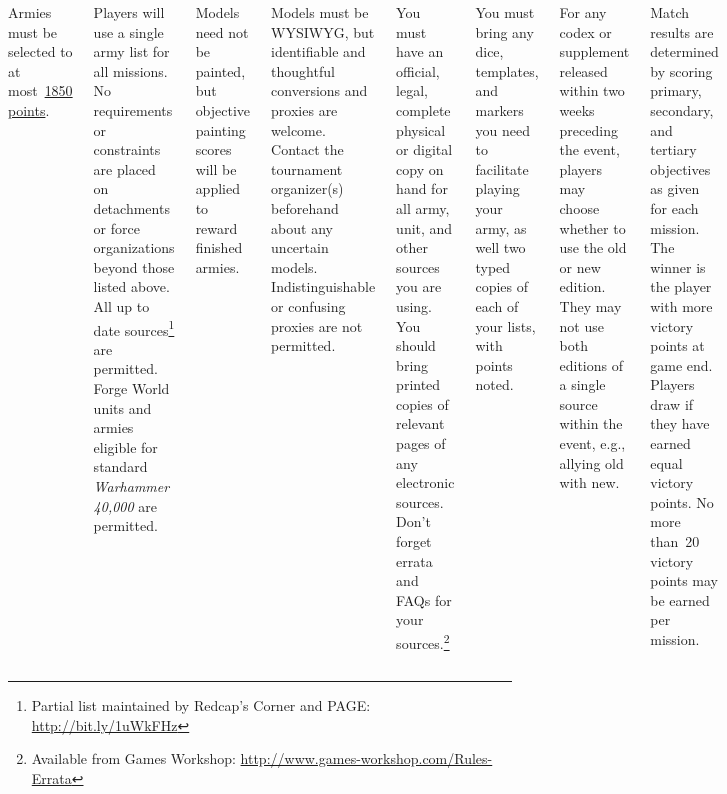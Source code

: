 \documentclass{40k}
\begin{document}

\begin{columns}


Armies must be selected to at most~\underline{1850 points}.


Players will use a single army list for all missions.  No requirements
or constraints are placed on detachments or force organizations beyond
those listed above.  All up to date sources\footnote{Partial list
  maintained by Redcap's Corner and PAGE: \url{http://bit.ly/1uWkFHz}}
are permitted.  Forge World units and armies eligible for standard
\emph{Warhammer 40,000} are permitted.

Models need not be painted, but objective painting scores will be
applied to reward finished armies.

Models must be WYSIWYG, but identifiable and thoughtful conversions
and proxies are welcome.  Contact the tournament organizer(s)
beforehand about any uncertain models.  Indistinguishable or confusing
proxies are not permitted.


You must have an official, legal, complete physical or digital copy on
hand for all army, unit, and other sources you are using.  You should
bring printed copies of relevant pages of any electronic sources.
Don't forget errata and FAQs for your sources.\footnote{Available from
  Games Workshop:
  \url{http://www.games-workshop.com/Rules-Errata}}

You must bring any dice, templates, and markers you need to facilitate
playing your army, as well two typed copies of each of your lists,
with points noted.

For any codex or supplement released within two weeks preceding the
event, players may choose whether to use the old or new edition.  They
may not use both editions of a single source within the event, e.g.,
allying old with new.


%

Match results are determined by scoring primary, secondary, and
tertiary objectives as given for each mission.  The winner is the
player with more victory points at game end.  Players draw if they
have earned equal victory points.  No more than~20 victory points may
be earned per mission.


\end{columns}
\end{document}
